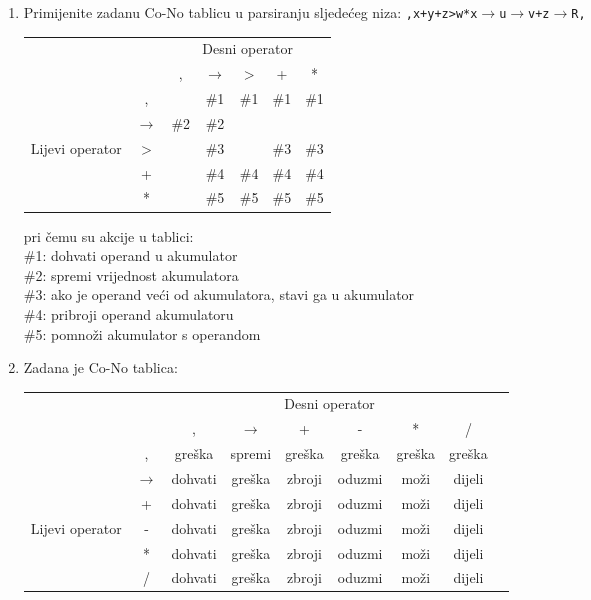 \documentclass[times, 12pt, utf8]{book}
\begin{document}
\begin{enumerate}[resume]
\item
Primijenite zadanu Co-No tablicu u parsiranju sljedećeg niza: \texttt{,x+y+z>w*x\(\rightarrow\)u\(\rightarrow\)v+z\(\rightarrow\)R,}

\begin{tabular}{c c | c | c | c | c | c | }
\cline{3-7}
& & \multicolumn{5}{|c|}{Desni operator} \\ \cline{3-7}
& & , & $\to$ & $>$ & + & * \\ \cline{1-7}
\multicolumn{1}{|c|}{} & , &  & \#1 & \#1 & \#1 & \#1  \\ \cline{2-7}
\multicolumn{1}{|c|}{} & $\to$ & \#2 & \#2 & & &  \\ \cline{2-7}
\multicolumn{1}{|c|}{Lijevi operator} & $>$ & & \#3 &  & \#3 & \#3 \\ \cline{2-7}
\multicolumn{1}{|c|}{} & + &  & \#4 & \#4 & \#4 & \#4 \\ \cline{2-7}
\multicolumn{1}{|c|}{} & * &  & \#5 & \#5 & \#5 & \#5 \\ \cline{1-7}
\end{tabular}

pri čemu su akcije u tablici:\\
\#1: dohvati operand u akumulator \\
\#2: spremi vrijednost akumulatora \\
\#3: ako je operand veći od akumulatora, stavi ga u akumulator \\
\#4: pribroji operand akumulatoru \\
\#5: pomnoži akumulator s operandom \cite[str.~83-84]{udzbenik} \cite{auditorne}

\item
Zadana je Co-No tablica:

\begin{tabular}{ c c | c | c | c | c | c | c | c | }
\cline{3-8}
& & \multicolumn{6}{|c|}{Desni operator} \\ \cline{3-8}
& & , & \(\to\) & + & - & * & / \\ \cline{1-8}
\multicolumn{1}{|c|}{} & , & greška & spremi & greška & greška & greška & greška \\ \cline{2-8}
\multicolumn{1}{|c|}{} & \(\to\) & dohvati & greška & zbroji & oduzmi & moži & dijeli \\ \cline{2-8}
\multicolumn{1}{|c|}{} & + & dohvati & greška & zbroji & oduzmi & moži & dijeli \\ \cline{2-8}
\multicolumn{1}{|c|}{Lijevi operator} & - & dohvati & greška & zbroji & oduzmi & moži & dijeli \\ \cline{2-8}
\multicolumn{1}{|c|}{} & * & dohvati & greška & zbroji & oduzmi & moži & dijeli \\ \cline{2-8}
\multicolumn{1}{|c|}{} & / & dohvati & greška & zbroji & oduzmi & moži & dijeli \\ \hline
\end{tabular}


\end{enumerate}
\end{document}

